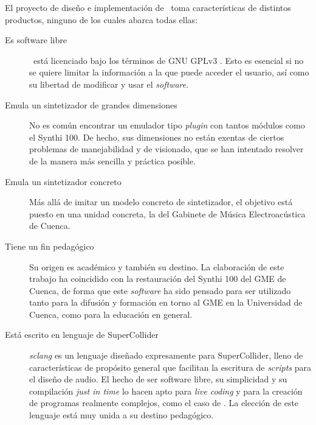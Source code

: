 El proyecto de diseño e implementación de \appName~toma características de distintos productos, ninguno de los cuales abarca todas ellas:

\begin{description}
	\item[Es software libre] \appName~está licenciado bajo los términos de GNU GPLv3 \citeyear{gpl}. Esto es esencial si no se quiere limitar la información a la que puede acceder el usuario, así como su libertad de modificar y usar el \textit{software}. 
	
	\item[Emula un sintetizador de grandes dimensiones] No es común encontrar un emulador tipo \textit{plugin} con tantos módulos como el Synthi 100. De hecho, sus dimensiones no están exentas de ciertos problemas de manejabilidad y de visionado, que se han intentado resolver de la manera más sencilla y práctica posible.
	
	\item[Emula un sintetizador concreto] Más allá de imitar un modelo concreto de sintetizador, el objetivo está puesto en una unidad concreta, la del Gabinete de Música Electroacústica de Cuenca. 
	
	\item[Tiene un fin pedagógico] Su origen es académico y también su destino. La elaboración de este trabajo ha coincidido con la restauración del Synthi 100 del GME de Cuenca, de forma que este \textit{software} ha sido pensado para ser utilizado tanto para la difusión y formación en torno al GME en la Universidad de Cuenca, como para la educación en general. 
	
	\item[Está escrito en lenguaje de SuperCollider] \textit{sclang} es un lenguaje diseñado expresamente para SuperCollider, lleno de características de propósito general que facilitan la escritura de \textit{scripts} para el diseño de audio. El hecho de ser software libre, su simplicidad y su  compilación \textit{just in time} lo hacen apto para \textit{live coding} y para la creación de programas realmente complejos, como el caso de \appName. La elección de este lenguaje está muy unida a su destino pedagógico.
\end{description}



